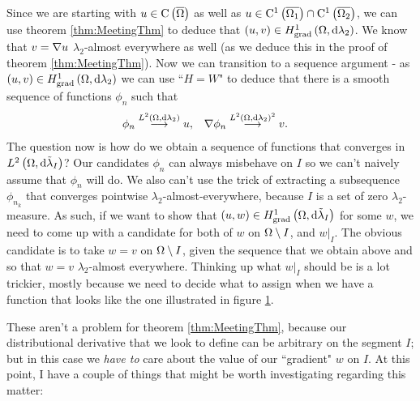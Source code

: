 \documentclass[11pt]{report}
\theoremstyle{plain}
\newcommand{\tlambda}{\tilde{\lambda}}
\newcommand{\C}[1]{\mathrm{C}^1\bracs{#1}}
\begin{document}
Since we are starting with $u\in\mathrm{C}\left( \overline{\Omega} \right)$ as well as $u\in \C{\overline{\ddom_1}}\cap \C{\overline{\ddom_2}}$, we can use theorem \ref{thm:MeetingThm} to deduce that $\left( u,v \right)\in H^1_\mathrm{grad}\left( \Omega, \mathrm{d}\lambda_2 \right)$.
We know that $v = \nabla u$ $\lambda_2$-almost everywhere as well (as we deduce this in the proof of theorem \ref{thm:MeetingThm}).
Now we can transition to a sequence argument - as $\left( u,v \right)\in H^1_\mathrm{grad}\left( \Omega, \mathrm{d}\lambda_2 \right)$ we can use ``$H=W$" to deduce that there is a smooth sequence of functions $\phi_n$ such that
\begin{align*}
	\phi_n \overset{L^{2}\left( \Omega,\mathrm{d}\lambda_2 \right)}{\longrightarrow} u, &\quad \nabla\phi_n \overset{L^{2}\left( \Omega,\mathrm{d}\lambda_2 \right)^2}{\longrightarrow} v.
\end{align*}
The question now is how do we obtain a sequence of functions that converges in $\ltwo{\ddom}{\tlambda_I}$?
Our candidates $\phi_n$ can always misbehave on $I$ so we can't naively assume that $\phi_n$ will do.
We also can't use the trick of extracting a subsequence $\phi_{n_k}$ that converges pointwise $\lambda_2$-almost-everywhere, because $I$ is a set of zero $\lambda_2$-measure.
As such, if we want to show that $\bracs{u,w}\in\gradSob{\ddom}{\tlambda_I}$ for some $w$, we need to come up with a candidate for both of $w$ on $\Omega\setminus I$, and $w\vert_I$.
The obvious candidate is to take $w=v$ on $\Omega\setminus I$, given the sequence that we obtain above and so that $w=v$ $\lambda_2$-almost everywhere.
Thinking up what $w\vert_I$ should be is a lot trickier, mostly because we need to decide what to assign when we have a function that looks like the one illustrated in figure \ref{fig:ContButNonDiff}.
\begin{figure}[h!]
	\centering
	\caption{\label{fig:ContButNonDiff}}
\end{figure}
These aren't a problem for theorem \ref{thm:MeetingThm}, because our distributional derivative that we look to define can be arbitrary on the segment $I$; but in this case we \textit{have to} care about the value of our ``gradient" $w$ on $I$.
At this point, I have a couple of things that might be worth investigating regarding this matter:
\end{document}
